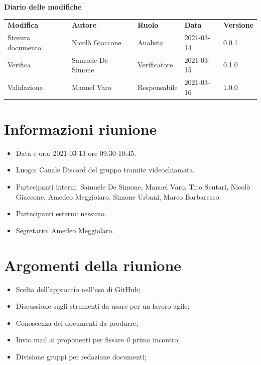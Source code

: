 \documentclass[a4paper]{article}
\begin{document}
        \begin{center}
            \textbf{\Large Diario delle modifiche}\\
            \vspace{10px}
            \begin{table}[h!]
            \centering
            \renewcommand{\arraystretch}{1.8}
            \begin{tabular}{p{150px} p{90px} p{70px} p{60px} p{45px}}
                \rowcolor{logo!70} \textbf{Modifica} & \textbf{Autore} & \textbf{Ruolo} & \textbf{Data} & \textbf{Versione}\\
                Stesura documento & Nicolò Giaccone & Analista & 2021-03-14 & 0.0.1\\   
                Verifica & Samuele De Simone & Verificatore & 2021-03-15 & 0.1.0\\
                Validazione & Manuel Varo & Responsabile & 2021-03-16 & 1.0.0
            \end{tabular}
        \end{table}
        \end{center}
    
        \newpage
        \tableofcontents
        \newpage

    \section{Informazioni riunione}
    \begin{itemize}
        \item Data e ora: 2021-03-13 ore 09.30-10.45.
        \item Luogo: Canale Discord del gruppo tramite videochiamata.
        \item Partecipanti interni: Samuele De Simone, Manuel Varo, Tito Scutari, Nicolò Giaccone, Amedeo Meggiolaro, Simone Urbani, Marco Barbaresco.
        \item Partecipanti esterni: nessuno.
        \item Segretario: Amedeo Meggiolaro.
    \end{itemize}
    \section{Argomenti della riunione}
    \begin{itemize}
        \item Scelta dell'approccio nell'uso di GitHub;
        \item Discussione sugli strumenti da usare per un lavoro agile;
        \item Conoscenza dei documenti da produrre;
        \item Invio mail ai proponenti per fissare il primo incontro;
        \item Divisione gruppi per redazione documenti;
    \end{itemize}
\end{document}
